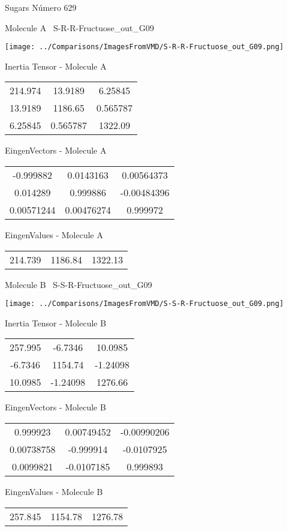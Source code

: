 \vtab[-3cm]
\begin{center}
{\large Sugars \tab Número 629}
\end{center}
\begin{multicols}{2}
\begin{center}

Molecule A \
S-R-R-Fructuose\_out\_G09

\texttt{[image: ../Comparisons/ImagesFromVMD/S-R-R-Fructuose\_out\_G09.png]}

Inertia Tensor - Molecule A \\
\begin{tabular}{|c c c|}
214.974	 & 	13.9189	 & 	6.25845	 \\
13.9189	 & 	1186.65	 & 	0.565787	 \\
6.25845	 & 	0.565787	 & 	1322.09
\end{tabular}

\vtab
 EingenVectors - Molecule A     \\
\begin{tabular}{|c c c|}
-0.999882	 & 	0.0143163	 & 	0.00564373	 \\
0.014289	 & 	0.999886	 & 	-0.00484396	 \\
0.00571244	 & 	0.00476274	 & 	0.999972
\end{tabular}

\vtab
 EingenValues - Molecule A     \\
\begin{tabular}{|c c c|}
214.739	 & 	1186.84	 & 	1322.13	 \\
\end{tabular}
\columnbreak

Molecule B \
S-S-R-Fructuose\_out\_G09

\texttt{[image: ../Comparisons/ImagesFromVMD/S-S-R-Fructuose\_out\_G09.png]}

Inertia Tensor - Molecule B \\
\begin{tabular}{|c c c|}
257.995	 & 	-6.7346	 & 	10.0985	 \\
-6.7346	 & 	1154.74	 & 	-1.24098	 \\
10.0985	 & 	-1.24098	 & 	1276.66
\end{tabular}

\vtab
 EingenVectors - Molecule B     \\
\begin{tabular}{|c c c|}
0.999923	 & 	0.00749452	 & 	-0.00990206	 \\
0.00738758	 & 	-0.999914	 & 	-0.0107925	 \\
0.0099821	 & 	-0.0107185	 & 	0.999893
\end{tabular}

\vtab
 EingenValues - Molecule B     \\
\begin{tabular}{|c c c|}
257.845	 & 	1154.78	 & 	1276.78	 \\
\end{tabular}

\end{center}
\end{multicols}

